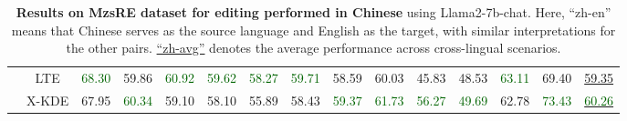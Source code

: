\begin{table*}[!h]
{\begin{tabular}{ccccccccccccccc}
            & LTE & \textcolor{darkgreen}{68.30} & 59.86 & \textcolor{darkgreen}{60.92} & \textcolor{darkgreen}{59.62} & \textcolor{darkgreen}{58.27} & \textcolor{darkgreen}{59.71} & 58.59 & 60.03 & 45.83 & 48.53 & \textcolor{darkgreen}{63.11} & 69.40 & \underline{59.35} \\
           \cmidrule{2-15}
            & X-KDE & 67.95 & \textcolor{darkgreen}{60.34} & 59.10 & 58.10 & 55.89 & 58.43 & \textcolor{darkgreen}{59.37} & \textcolor{darkgreen}{61.73} & \textcolor{darkgreen}{56.27} & \textcolor{darkgreen}{49.69} & 62.78 & \textcolor{darkgreen}{73.43} & \underline{\textcolor{darkgreen}{60.26}} \\
           \bottomrule
        \end{tabular}
    }
    \caption{\textbf{Results on MzsRE dataset for editing performed in Chinese} using Llama2-7b-chat. Here, ``zh-en'' means that Chinese serves as the source language and English as the target, with similar interpretations for the other pairs. \underline{``zh-avg''} denotes the average performance across cross-lingual scenarios.}
    \label{tab:ap-zh-edit}
\end{table*}



